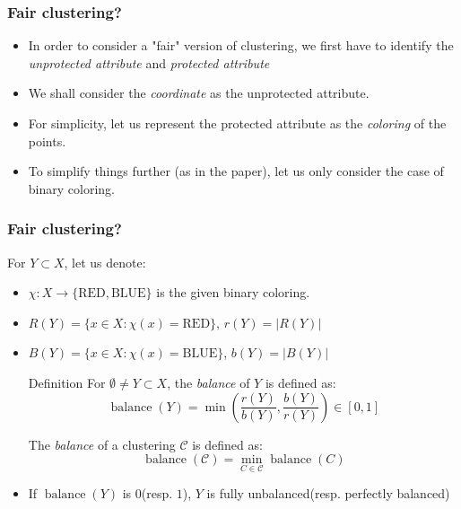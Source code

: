 \documentclass{beamer}
\DeclareMathOperator{\balance}{balance}
\begin{document}


\begin{frame}
\frametitle{Fair clustering?}

\begin{itemize}
    \item In order to consider a "fair" version of clustering, we first have to identify the {\it unprotected attribute} and {\it protected attribute} \pause
    \item We shall consider the {\it coordinate} as the unprotected attribute. \pause
    \item For simplicity, let us represent the protected attribute as the {\it coloring} of the points. \pause
    \item To simplify things further (as in the paper), let us only consider the case of binary coloring.
\end{itemize}

\end{frame}



\begin{frame}
\frametitle{Fair clustering?}
For $Y \subset X$, let us denote:
\begin{itemize}
	\item $\chi : X \rightarrow \{\text{RED}, \text{BLUE}\}$ is the given binary coloring.
	\item $R(Y) = \{x \in X : \chi(x) = \text{RED}\}$, $r(Y) = |R(Y)|$
	\item $B(Y) = \{x \in X : \chi(x) = \text{BLUE}\}$, $b(Y) = |B(Y)|$ \pause
\begin{block}{Definition}
For $\emptyset \not= Y \subset X$, the {\it balance} of $Y$ is defined as:
$$\balance(Y) = \min \left( \frac{r(Y)}{b(Y)}, \frac{b(Y)}{r(Y)} \right) \in [0, 1]$$

The {\it balance} of a clustering $\mathcal{C}$ is defined as:
$$\balance(\mathcal{C}) = \min_{C \in \mathcal{C}} \balance(C)$$
\end{block}

	\item If $\balance(Y)$ is $0$(resp. $1$), $Y$ is fully unbalanced(resp. perfectly balanced)
\end{itemize}

\end{frame}
\end{document}
